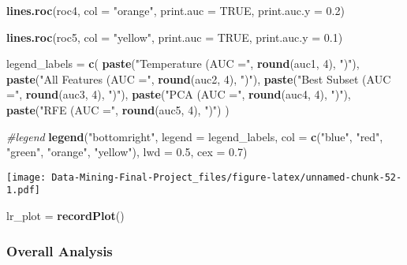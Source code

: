 \documentclass[
]{article}
\newenvironment{Shaded}{\begin{snugshade}}{\end{snugshade}}
\newcommand{\AttributeTok}[1]{\textcolor[rgb]{0.13,0.29,0.53}{#1}}
\newcommand{\CommentTok}[1]{\textcolor[rgb]{0.56,0.35,0.01}{\textit{#1}}}
\newcommand{\ConstantTok}[1]{\textcolor[rgb]{0.56,0.35,0.01}{#1}}
\newcommand{\DecValTok}[1]{\textcolor[rgb]{0.00,0.00,0.81}{#1}}
\newcommand{\FloatTok}[1]{\textcolor[rgb]{0.00,0.00,0.81}{#1}}
\newcommand{\FunctionTok}[1]{\textcolor[rgb]{0.13,0.29,0.53}{\textbf{#1}}}
\newcommand{\NormalTok}[1]{#1}
\newcommand{\OtherTok}[1]{\textcolor[rgb]{0.56,0.35,0.01}{#1}}
\newcommand{\StringTok}[1]{\textcolor[rgb]{0.31,0.60,0.02}{#1}}
\begin{document}
\begin{Shaded}
\begin{Highlighting}[]
\FunctionTok{lines.roc}\NormalTok{(roc4, }\AttributeTok{col =} \StringTok{"orange"}\NormalTok{, }\AttributeTok{print.auc =} \ConstantTok{TRUE}\NormalTok{, }\AttributeTok{print.auc.y =} \FloatTok{0.2}\NormalTok{)}

\FunctionTok{lines.roc}\NormalTok{(roc5, }\AttributeTok{col =} \StringTok{"yellow"}\NormalTok{, }\AttributeTok{print.auc =} \ConstantTok{TRUE}\NormalTok{, }\AttributeTok{print.auc.y =} \FloatTok{0.1}\NormalTok{)}

\NormalTok{legend\_labels }\OtherTok{=} \FunctionTok{c}\NormalTok{(}
  \FunctionTok{paste}\NormalTok{(}\StringTok{"Temperature (AUC ="}\NormalTok{, }\FunctionTok{round}\NormalTok{(auc1, }\DecValTok{4}\NormalTok{), }\StringTok{")"}\NormalTok{),}
  \FunctionTok{paste}\NormalTok{(}\StringTok{"All Features (AUC ="}\NormalTok{, }\FunctionTok{round}\NormalTok{(auc2, }\DecValTok{4}\NormalTok{), }\StringTok{")"}\NormalTok{),}
  \FunctionTok{paste}\NormalTok{(}\StringTok{"Best Subset (AUC ="}\NormalTok{, }\FunctionTok{round}\NormalTok{(auc3, }\DecValTok{4}\NormalTok{), }\StringTok{")"}\NormalTok{),}
  \FunctionTok{paste}\NormalTok{(}\StringTok{"PCA (AUC ="}\NormalTok{, }\FunctionTok{round}\NormalTok{(auc4, }\DecValTok{4}\NormalTok{), }\StringTok{")"}\NormalTok{),}
  \FunctionTok{paste}\NormalTok{(}\StringTok{"RFE (AUC ="}\NormalTok{, }\FunctionTok{round}\NormalTok{(auc5, }\DecValTok{4}\NormalTok{), }\StringTok{")"}\NormalTok{)}
\NormalTok{)}

\CommentTok{\#legend}
\FunctionTok{legend}\NormalTok{(}\StringTok{"bottomright"}\NormalTok{, }\AttributeTok{legend =}\NormalTok{ legend\_labels, }\AttributeTok{col =} \FunctionTok{c}\NormalTok{(}\StringTok{"blue"}\NormalTok{, }\StringTok{"red"}\NormalTok{, }\StringTok{"green"}\NormalTok{, }\StringTok{"orange"}\NormalTok{, }\StringTok{"yellow"}\NormalTok{), }\AttributeTok{lwd =} \FloatTok{0.5}\NormalTok{, }\AttributeTok{cex =} \FloatTok{0.7}\NormalTok{)}
\end{Highlighting}
\end{Shaded}

\texttt{[image: Data-Mining-Final-Project\_files/figure-latex/unnamed-chunk-52-1.pdf]}

\begin{Shaded}
\begin{Highlighting}[]
\NormalTok{lr\_plot }\OtherTok{=} \FunctionTok{recordPlot}\NormalTok{()}
\end{Highlighting}
\end{Shaded}

\subsubsection{Overall Analysis}\label{overall-analysis}
\end{document}
